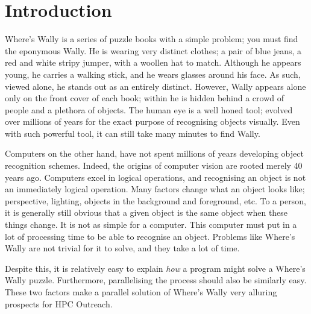 \documentclass[../main.tex]{subfiles}
\begin{document}
  \section{Introduction}
  Where's Wally is a series of puzzle books with a simple problem; you must find the eponymous Wally.
  He is wearing very distinct clothes; a pair of blue jeans, a red and white stripy jumper, with a woollen hat to match.
  Although he appears young, he carries a walking stick, and he wears glasses around his face.
  As such, viewed alone, he stands out as an entirely distinct.
  However, Wally appears alone only on the front cover of each book; within he is hidden behind a crowd of people and a plethora of objects.
  The human eye is a well honed tool; evolved over millions of years for the exact purpose of recognising objects visually.
  Even with such powerful tool, it can still take many minutes to find Wally.

  Computers on the other hand, have not spent millions of years developing object recognition schemes.
  Indeed, the origins of computer vision are rooted merely 40 years ago.
  Computers excel in logical operations, and recognising an object is not an immediately logical operation.
  Many factors change what an object looks like; perspective, lighting, objects in the background and foreground, etc.
  To a person, it is generally still obvious that a given object is the same object when these things change.
  It is not as simple for a computer.
  This computer must put in a lot of processing time to be able to recognise an object.
  Problems like Where's Wally are not trivial for it to solve, and they take a lot of time.

  Despite this, it is relatively easy to explain \emph{how} a program might solve a Where's Wally puzzle.
  Furthermore, parallelising the process should also be similarly easy.
  These two factors make a parallel solution of Where's Wally very alluring prospects for HPC Outreach.
  \biblio
\end{document}
